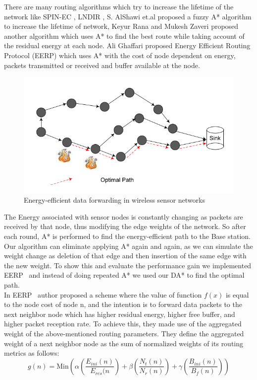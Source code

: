 \documentclass[a4paper]{article}
\begin{document}
There are many routing algorithms which try to increase the lifetime of the network like SPIN-EC \cite{SPIN-EC}, LNDIR \cite{LNDIR}, S. AlShawi et.al \cite{WSNfuzzy} proposed a fuzzy A* algorithm to increase the lifetime of network, Keyur Rana and Mukesh Zaveri \cite{WSN2011} proposed another algorithm which uses A* to find the best route while taking account of the residual energy at each node. Ali Ghaffari \cite{WSN2014} proposed Energy Efficient Routing Protocol (EERP) which uses A* with the cost of node dependent on energy, packets transmitted or received and buffer available at the node.
\begin{figure}[H]
    \centering
    \includegraphics[scale=0.35]{img/network.png}
    \caption{Energy-efficient data forwarding in wireless sensor networks\cite{WSN2014}}
    \label{figex_network}
\end{figure}
The Energy associated with sensor nodes is constantly changing as packets are received by that node, thus modifying the edge weights of the network. So after each round, A* is performed to find the energy-efficient path to the Base station. Our algorithm can eliminate applying A* again and again, as we can simulate the weight change as deletion of that edge and then insertion of the same edge with the new weight. To show this and evaluate the performance gain we implemented EERP~\cite{WSN2014} and instead of doing repeated A* we used our DA* to find the optimal path.\\

In EERP~\cite{WSN2014} author proposed a scheme where the value of
function $f(x)$ is equal to the node cost of node n, and the intention is to forward data packets to the next neighbor node which has higher residual energy, higher free buffer, and higher packet reception rate. To achieve this, they made use of the aggregated weight of the above-mentioned routing parameters. They define the aggregated weight of a next neighbor node as the sum of normalized weights of its routing metrics as follows:
\begin{equation}
    g(n) = \text{Min}(\alpha(\frac{E_{ini}(n)}{E_{res}(n}) + \beta(\frac{N_t(n)}{N_r(n)}) + \gamma(\frac{B_{ini}(n)}{B_f(n)}) )
\end{equation}
\end{document}
